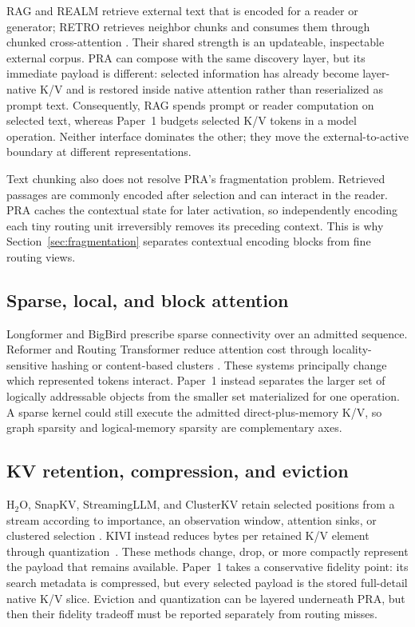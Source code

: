 \documentclass[11pt]{article}
\begin{document}
RAG and REALM retrieve external text that is encoded for a reader or generator;
RETRO retrieves neighbor chunks and consumes them through chunked cross-attention
\cite{lewis2020rag,guu2020realm,borgeaud2022retro}.
Their shared strength is an updateable,
inspectable external corpus. PRA can compose with the same discovery layer,
but its immediate payload is different: selected information has already become
layer-native K/V and is restored inside native attention rather than reserialized as
prompt text. Consequently, RAG spends prompt or reader computation on selected text,
whereas Paper~1 budgets selected K/V tokens in a model operation.
Neither interface dominates the other; they move the external-to-active boundary at
different representations.

Text chunking also does not resolve PRA's fragmentation problem.
Retrieved passages are commonly encoded after selection and can interact in the reader.
PRA caches the contextual state for later activation,
so independently encoding each tiny routing unit irreversibly removes its preceding
context. This is why Section~\ref{sec:fragmentation} separates contextual encoding
blocks from fine routing views.

\subsection{Sparse, local, and block attention}

Longformer and BigBird prescribe sparse connectivity over an admitted sequence.
Reformer and Routing Transformer reduce attention cost through locality-sensitive
hashing or content-based clusters
\cite{beltagy2020longformer,zaheer2020bigbird,kitaev2020reformer,roy2021routing}.
These systems principally change which represented tokens interact.
Paper~1 instead separates the larger set of logically addressable objects from the
smaller set materialized for one operation. A sparse kernel could still execute the
admitted direct-plus-memory K/V, so graph sparsity and logical-memory sparsity are
complementary axes.

\subsection{KV retention, compression, and eviction}

H$_2$O, SnapKV, StreamingLLM, and ClusterKV retain selected positions from a stream
according to importance, an observation window, attention sinks, or clustered selection
\cite{zhang2023h2o,li2024snapkv,xiao2023streamingllm,liu2024clusterkv}.
KIVI instead reduces
bytes per retained K/V element through quantization~\cite{liu2024kivi}.
These methods change, drop, or more compactly represent the payload that remains
available. Paper~1 takes a conservative fidelity point:
its search metadata is compressed, but every selected payload is the stored full-detail
native K/V slice. Eviction and quantization can be layered underneath PRA,
but then their fidelity tradeoff must be reported separately from routing misses.
\end{document}
